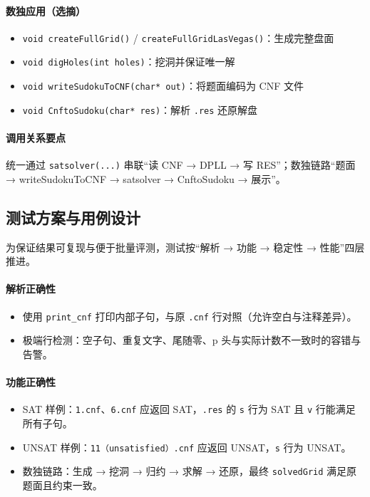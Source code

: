\documentclass[UTF8]{ctexart}
\begin{document}
\paragraph{数独应用（选摘）}
\begin{itemize}
  \item \texttt{void createFullGrid()} / \texttt{createFullGridLasVegas()}：生成完整盘面
  \item \texttt{void digHoles(int holes)}：挖洞并保证唯一解
  \item \texttt{void writeSudokuToCNF(char* out)}：将题面编码为 CNF 文件
  \item \texttt{void CnftoSudoku(char* res)}：解析 \texttt{.res} 还原解盘
\end{itemize}

\paragraph{调用关系要点}
统一通过 \texttt{satsolver(...)} 串联“读 CNF → DPLL → 写 RES”；数独链路“题面 → writeSudokuToCNF → satsolver → CnftoSudoku → 展示”。

\subsection{测试方案与用例设计}
为保证结果可复现与便于批量评测，测试按“解析 → 功能 → 稳定性 → 性能”四层推进。

\paragraph{解析正确性}
\begin{itemize}
  \item 使用 \texttt{print\_cnf} 打印内部子句，与原 \texttt{.cnf} 行对照（允许空白与注释差异）。
  \item 极端行检测：空子句、重复文字、尾随零、p 头与实际计数不一致时的容错与告警。
\end{itemize}

\paragraph{功能正确性}
\begin{itemize}
  \item SAT 样例：\texttt{1.cnf}、\texttt{6.cnf} 应返回 SAT，\texttt{.res} 的 \texttt{s} 行为 SAT 且 \texttt{v} 行能满足所有子句。
  \item UNSAT 样例：\texttt{11（unsatisfied）.cnf} 应返回 UNSAT，\texttt{s} 行为 UNSAT。
  \item 数独链路：生成 → 挖洞 → 归约 → 求解 → 还原，最终 \texttt{solvedGrid} 满足原题面且约束一致。
\end{itemize}
\end{document}
